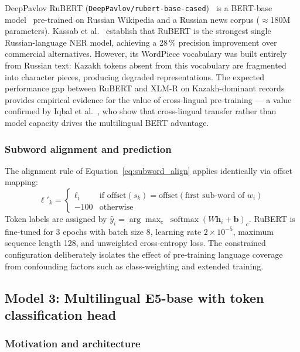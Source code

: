 DeepPavlov RuBERT (\texttt{DeepPavlov/rubert-base-cased})~\cite{kuratov2019rubert} is a BERT-base model~\cite{devlin2019bert} pre-trained on Russian Wikipedia and a Russian news corpus ($\approx$180M parameters). Kassab et al.~\cite{kassab2025russian} establish that RuBERT is the strongest single Russian-language NER model, achieving a 28\,\% precision improvement over commercial alternatives. However, its WordPiece vocabulary was built entirely from Russian text: Kazakh tokens absent from this vocabulary are fragmented into character pieces, producing degraded representations. The expected performance gap between RuBERT and XLM-R on Kazakh-dominant records provides empirical evidence for the value of cross-lingual pre-training — a value confirmed by Iqbal et al.~\cite{iqbal2024multilingual}, who show that cross-lingual transfer rather than model capacity drives the multilingual BERT advantage.

\subsubsection{Subword alignment and prediction}

The alignment rule of Equation~\eqref{eq:subword_align} applies identically via offset mapping:
\begin{equation}
  \ell'_k =
  \begin{cases}
    \ell_i & \text{if } \text{offset}(s_k) = \text{offset}(\text{first sub-word of } w_i) \\
    -100   & \text{otherwise}
  \end{cases}
  \label{eq:rubert_align}
\end{equation}
Token labels are assigned by $\hat{y}_i = \arg\max_c\;\operatorname{softmax}(W\mathbf{h}_i + \mathbf{b})_c$. RuBERT is fine-tuned for 3 epochs with batch size 8, learning rate $2 \times 10^{-5}$, maximum sequence length 128, and unweighted cross-entropy loss. The constrained configuration deliberately isolates the effect of pre-training language coverage from confounding factors such as class-weighting and extended training.

\subsection{Model 3: Multilingual E5-base with token classification head}
\label{sec:me5}

\subsubsection{Motivation and architecture}

